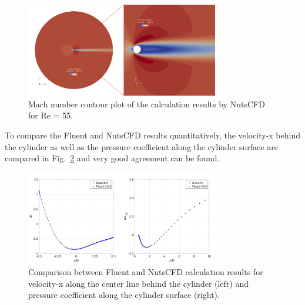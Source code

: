 \documentclass[journal,final]{new-aiaa}
\begin{document}
\begin{figure}[htb]
	\centering   
	\includegraphics[width=0.75\textwidth]{pic/cylinder-std.png}
	\caption{Mach number contour plot of the calculation results by NutsCFD for Re = 55.}
	\label{fig:cyl-re55}
\end{figure}

To compare the Fluent and NutsCFD results quantitatively, the velocity-x
behind the cylinder as well as the pressure coefficient along the cylinder
surface are compared in Fig.~\ref{fig:cyl-re55-u-cp} and very good agreement
can be found.
\begin{figure}[htb]
	\centering   
	\includegraphics[width=0.75\textwidth]{pic/cylinder-std-compare.png}
	\caption{Comparison between Fluent and NutsCFD calculation results for
		velocity-x along the center line behind the cylinder (left) and pressure
		coefficient along the cylinder surface (right).}
		\label{fig:cyl-re55-u-cp}
\end{figure}
\end{document}
